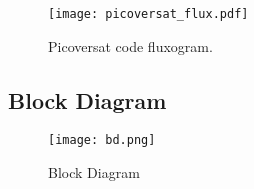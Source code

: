 \begin{figure}[htbp]
  \centerline{\texttt{[image: picoversat\_flux.pdf]}}
  \vspace{0cm}\caption{Picoversat code fluxogram.}
  \label{fig:fluxloop}
\end{figure}

\newpage

\subsection{Block Diagram}


\begin{figure}[!h]
    \centerline{\texttt{[image: bd.png]}}
    \vspace{0cm}\caption{Block Diagram}
    \label{fig:bd}
\end{figure}




